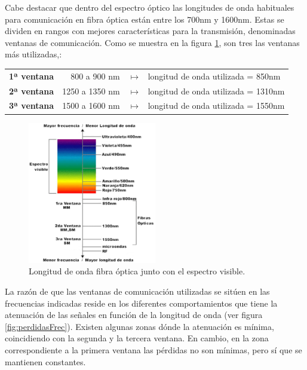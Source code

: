 \begin{itemize}
	Cabe destacar que dentro del espectro óptico las longitudes de onda habituales para comunicación en fibra óptica están entre los 700nm y 1600nm. Estas se dividen en rangos con mejores características para la transmisión, denominadas ventanas de comunicación. Como se muestra en la figura \ref{fig:ventanaOptica}, son tres las ventanas más utilizadas,\cite{ventanasFO}:
 	\begin{table}[H]
		\hspace{2cm}
		\renewcommand{\arraystretch}{2}
		\begin{tabular}{rrl}
			\textbf{1ª ventana}& 800 a  900 nm  & $\longmapsto$ $\,$ longitud de onda utilizada = 850nm  \\
			\textbf{2ª ventana}& 1250 a 1350 nm & $\longmapsto$ $\,$ longitud de onda utilizada = 1310nm  \\
			\textbf{3ª ventana}& 1500 a 1600 nm & $\longmapsto$ $\,$ longitud de onda utilizada = 1550nm   \\ 
		\end{tabular} 
	\end{table}

	 \begin{figure}[H]
	 	\centering
	 	\includegraphics[width=0.5\textwidth]{./img/ventana}
	 	\caption{Longitud de onda fibra óptica junto con el espectro visible. \cite{ventanasFO}}
	 	\label{fig:ventanaOptica}
	 \end{figure}
 	La razón de que las ventanas de comunicación utilizadas se sitúen en las frecuencias indicadas reside en los diferentes comportamientos que tiene la atenuación de las señales en función de la longitud de onda (ver figura \ref{fig:perdidasFrec}). Existen algunas zonas dónde la atenuación es mínima, coincidiendo con la segunda y la tercera ventana. En cambio, en la zona correspondiente a la primera ventana las pérdidas no son mínimas, pero sí que se mantienen constantes. 	
 	

\end{itemize}
